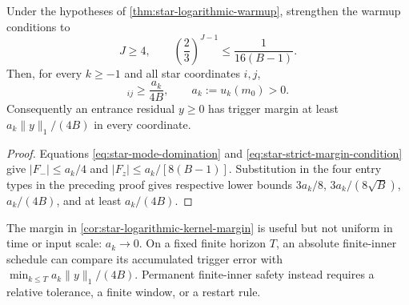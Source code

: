 \documentclass[11pt]{article}
\begin{document}
\begin{corollary}
\label{cor:star-logarithmic-kernel-margin}
Under the hypotheses of \cref{thm:star-logarithmic-warmup}, strengthen the
warmup conditions to
\begin{equation}
 J\geq4,\qquad
 \left(\frac23\right)^{J-1}\leq\frac{1}{16(B-1)}.
 \label{eq:star-strict-margin-condition}
\end{equation}
Then, for every $k\geq-1$ and all star coordinates $i,j$,
\begin{equation}
 [u_k(\overline{\mathcal M})]_{ij}
 \geq\frac{a_k}{4B},
 \qquad
 a_k:=u_k(m_0)>0.
 \label{eq:star-strict-kernel-margin}
\end{equation}
Consequently an entrance residual $y\geq0$ has trigger margin at least
$a_k\lVert y\rVert_1/(4B)$ in every coordinate.
\end{corollary}

\begin{proof}
Equations \eqref{eq:star-mode-domination} and
\eqref{eq:star-strict-margin-condition} give
$|F_-|\leq a_k/4$ and $|F_z|\leq a_k/[8(B-1)]$.  Substitution in the four
entry types in the preceding proof gives respective lower bounds
$3a_k/8$, $3a_k/(8\sqrt B)$, $a_k/(4B)$, and at least $a_k/(4B)$.
\end{proof}

The margin in \cref{cor:star-logarithmic-kernel-margin} is useful but not
uniform in time or input scale: $a_k\to0$.  On a fixed finite horizon $T$,
an absolute finite-inner schedule can compare its accumulated trigger error
with $\min_{k\leq T}a_k\lVert y\rVert_1/(4B)$.  Permanent finite-inner safety
instead requires a relative tolerance, a finite window, or a restart rule.
\end{document}
